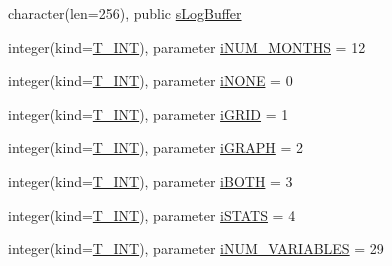 \begin{DoxyCompactItemize}
character(len=256), public \hyperlink{namespacetest_afa1c66465bae9135884cfa7867b9df30}{sLogBuffer}
\item 
integer(kind=\hyperlink{namespacetest_a6f91ebd89b58cfcc5da99faed9385c1e}{T\_\-INT}), parameter \hyperlink{namespacetest_af0399520b5b36576c3c4e8305b487c65}{iNUM\_\-MONTHS} = 12
\item 
integer(kind=\hyperlink{namespacetest_a6f91ebd89b58cfcc5da99faed9385c1e}{T\_\-INT}), parameter \hyperlink{namespacetest_a1f50531cf0fa6afcb5cea12a45a90947}{iNONE} = 0
\item 
integer(kind=\hyperlink{namespacetest_a6f91ebd89b58cfcc5da99faed9385c1e}{T\_\-INT}), parameter \hyperlink{namespacetest_ab7d5ec03d44589c79aea69862eda7b7a}{iGRID} = 1
\item 
integer(kind=\hyperlink{namespacetest_a6f91ebd89b58cfcc5da99faed9385c1e}{T\_\-INT}), parameter \hyperlink{namespacetest_abc7de6feee74a86b9aa08b5951e94d08}{iGRAPH} = 2
\item 
integer(kind=\hyperlink{namespacetest_a6f91ebd89b58cfcc5da99faed9385c1e}{T\_\-INT}), parameter \hyperlink{namespacetest_abd0173600806ba49317705aafe0c2bf3}{iBOTH} = 3
\item 
integer(kind=\hyperlink{namespacetest_a6f91ebd89b58cfcc5da99faed9385c1e}{T\_\-INT}), parameter \hyperlink{namespacetest_a4ee9e6e104ab7138d29b46b35a43f499}{iSTATS} = 4
\item 
integer(kind=\hyperlink{namespacetest_a6f91ebd89b58cfcc5da99faed9385c1e}{T\_\-INT}), parameter \hyperlink{namespacetest_ae9174c7998b12348b71aa854ca83add7}{iNUM\_\-VARIABLES} = 29
\item 

\end{DoxyCompactItemize}
